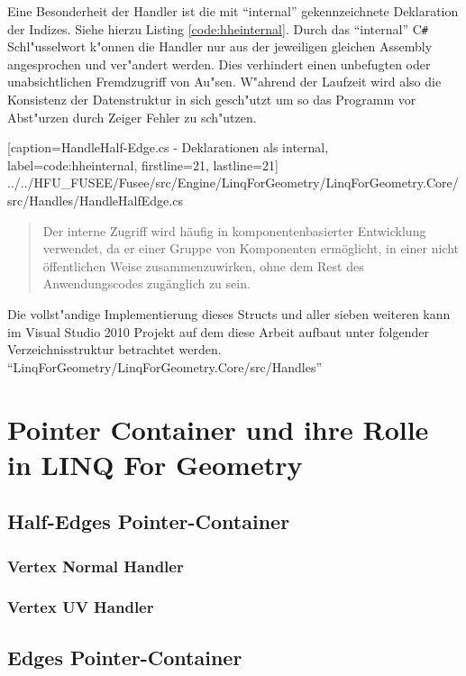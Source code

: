 \documentclass[12pt,a4paper]{scrreprt}
\newcommand{\CSS}{C\texttt{\# }}
\newcommand{\LFG}{LINQ For Geometry}
\begin{document}
Eine Besonderheit der Handler ist die mit "`internal"' gekennzeichnete Deklaration der Indizes. Siehe hierzu Listing \ref{code:hheinternal}. Durch das "`internal"' \CSS Schl"usselwort k"onnen die Handler nur aus der jeweiligen gleichen Assembly angesprochen und ver"andert werden. Dies verhindert einen unbefugten oder unabsichtlichen Fremdzugriff von Au"sen. W"ahrend der Laufzeit wird also die Konsistenz der Datenstruktur in sich gesch"utzt um so das Programm vor Abst"urzen durch Zeiger Fehler zu sch"utzen.

			[caption={HandleHalf-Edge.cs - Deklarationen als internal}, label=code:hheinternal, firstline=21, lastline=21]
			{../../HFU_FUSEE/Fusee/src/Engine/LinqForGeometry/LinqForGeometry.Core/src/Handles/HandleHalfEdge.cs}

\begin{quote}{\dq}Der interne Zugriff wird h{\"a}ufig in komponentenbasierter Entwicklung verwendet, da er einer Gruppe von Komponenten erm{\"o}glicht, in einer nicht {\"o}ffentlichen Weise zusammenzuwirken, ohne dem Rest des Anwendungscodes zug{\"a}nglich zu sein.{\dq} \cite{MicrosoftCReferenz.2013}\end{quote}


Die vollst"andige Implementierung dieses Structs und aller sieben weiteren kann im Visual Studio 2010 Projekt auf dem diese Arbeit aufbaut unter folgender Verzeichnisstruktur betrachtet werden. "`LinqForGeometry/LinqForGeometry.Core/src/Handles"'

\section {Pointer Container und ihre Rolle in \LFG}
		\subsection {Half-Edges Pointer-Container}

			\subsubsection {Vertex Normal Handler}
			
			\subsubsection {Vertex UV Handler}

		\subsection {Edges Pointer-Container}
\end{document}
